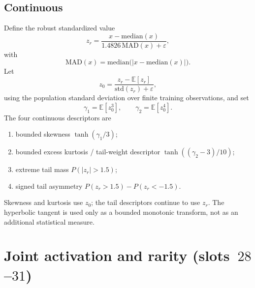 \subsection*{Continuous}
Define the robust standardized value
\begin{equation}
\label{eq:app-zr}
z_{r}
=
\frac{x-\mathrm{median}(x)}{1.4826\,\mathrm{MAD}(x)+\varepsilon},
\end{equation}
with
\begin{equation}
\mathrm{MAD}(x)=\mathrm{median}\bigl(\lvert x-\mathrm{median}(x)\rvert\bigr).
\end{equation}
Let
\begin{equation}
z_{0}
=
\frac{z_{r}-\mathbb{E}[z_{r}]}{\mathrm{std}(z_{r})+\varepsilon},
\end{equation}
using the population standard deviation over finite training observations, and set
\begin{equation}
\gamma_{1}=\mathbb{E}[z_{0}^{3}],\qquad \gamma_{2}=\mathbb{E}[z_{0}^{4}].
\end{equation}
The four continuous descriptors are
\begin{enumerate}[label=\arabic*.]
\item bounded skewness $\tanh(\gamma_{1}/3)$;
\item bounded excess kurtosis / tail-weight descriptor $\tanh((\gamma_{2}-3)/10)$;
\item extreme tail mass $P(\lvert z_{r}\rvert>1.5)$;
\item signed tail asymmetry $P(z_{r}>1.5)-P(z_{r}<-1.5)$.
\end{enumerate}
Skewness and kurtosis use $z_{0}$; the tail descriptors continue to use $z_{r}$.
The hyperbolic tangent is used only as a bounded monotonic transform, not as an additional statistical measure.

\section{Joint activation and rarity (slots~$28$--$31$)}
\label{app:hcr-joint}

